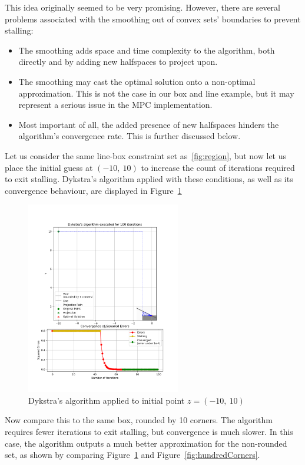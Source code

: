 \documentclass[hidelinks]{article}
\begin{document}
%
\par This idea originally seemed to be very promising. However, there are several problems associated with the smoothing out of convex sets' boundaries to prevent stalling:
%
\begin{itemize}
    \item The smoothing adds space and time complexity to the algorithm, both directly and by adding new halfspaces to project upon.
    \item The smoothing may cast the optimal solution onto a non-optimal approximation. This is not the case in our box and line example, but it may represent a serious issue in the MPC implementation.
    \item Most important of all, the added presence of new halfspaces hinders the algorithm's convergence rate. This is further discussed  below.
\end{itemize}
%
Let us consider the same line-box constraint set as~\ref{fig:region}, but now let us place the initial guess at $(-10,~10)$ to increase the count of iterations required to exit stalling. Dykstra's algorithm applied with these conditions, as well as its convergence behaviour, are displayed in Figure~\ref{fig:oneCorner}
%
\begin{figure}[h!]
    \centering
    
    \includegraphics[width=0.6\textwidth]{one_corner_rounding.png}
    \caption{Dykstra's algorithm applied to initial point $z = (-10,~10)$}
    \label{fig:oneCorner}

\end{figure}
%
\newpage
\par Now compare this to the same box, rounded by 10 corners. The algorithm requires fewer iterations to exit stalling, but convergence is much slower. In this case, the algorithm outputs a much better approximation for the non-rounded set, as shown by comparing Figure~\ref{fig:oneCorner} and Figure~\ref{fig:hundredCorners}.
\end{document}
